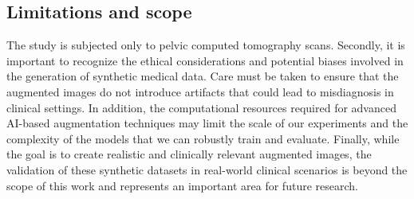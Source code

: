 \subsection{Limitations and scope}
The study is subjected only to pelvic computed tomography scans.  
Secondly, it is important to recognize the ethical considerations and potential biases involved in the generation of synthetic medical data. Care must be taken to ensure that the augmented images do not introduce artifacts that could lead to misdiagnosis in clinical settings. In addition, the computational resources required for advanced AI-based augmentation techniques may limit the scale of our experiments and the complexity of the models that we can robustly train and evaluate. 
Finally, while the goal is to create realistic and clinically relevant augmented images, the validation of these synthetic datasets in real-world clinical scenarios is beyond the scope of this work and represents an important area for future research.
